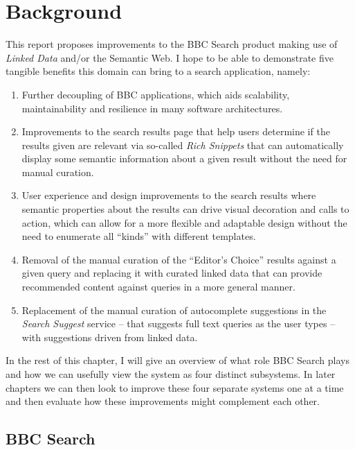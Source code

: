 \chapter{Background}

This report proposes improvements to the BBC Search product making use
of \emph{Linked Data}\cite{bizer2009linked} and/or the Semantic
Web\cite{berners2001semantic}. I hope to be able to demonstrate five tangible
benefits this domain can bring to a search application, namely:

\begin{enumerate}
  \item Further decoupling of BBC applications, which aids scalability,
    maintainability and resilience in many software architectures.\cite{}
  \item Improvements to the search results page that help users determine
    if the results given are relevant via so-called
    \emph{Rich Snippets}\cite{goel2009introducing}
    that can automatically display some semantic information about a given
    result without the need for manual curation.
  \item User experience and design improvements to the search results
    where semantic properties about the results can drive visual decoration
    and calls to action, which can allow for a more flexible and
    adaptable design without the need to enumerate all ``kinds'' with
    different templates.
  \item Removal of the manual curation of the ``Editor's Choice'' results
    against a given query and replacing it with curated linked data that
    can provide recommended content against queries in a more general
    manner.
  \item Replacement of the manual curation of autocomplete suggestions
    in the \emph{Search Suggest} service -- that suggests full text queries
    as the user types -- with suggestions driven from linked data.
\end{enumerate}

In the rest of this chapter, I will give an overview of what role BBC
Search plays and how we can usefully view the system as four
distinct subsystems. In later chapters we can then look to improve these
four separate systems one at a time and then evaluate how these improvements
might complement each other.

\section{BBC Search}

